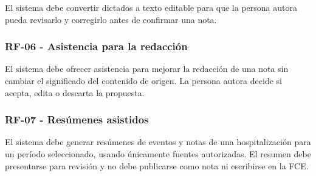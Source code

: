 El sistema debe convertir dictados a texto editable para que la persona autora pueda revisarlo y corregirlo antes de confirmar una nota.

\subsubsection*{\textbf{RF-06} - Asistencia para la redacción}

El sistema debe ofrecer asistencia para mejorar la redacción de una nota sin cambiar el significado del contenido de origen. La persona autora decide si acepta, edita o descarta la propuesta.

\subsubsection*{\textbf{RF-07} - Resúmenes asistidos}

El sistema debe generar resúmenes de eventos y notas de una hospitalización para un período seleccionado, usando únicamente fuentes autorizadas. El resumen debe presentarse para revisión y no debe publicarse como nota ni escribirse en la FCE.
